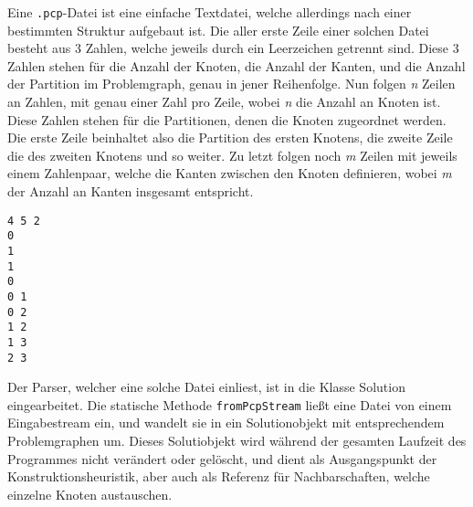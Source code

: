 Eine \texttt{.pcp}-Datei ist eine einfache Textdatei, welche allerdings nach einer bestimmten Struktur aufgebaut ist. Die aller erste Zeile
einer solchen Datei besteht aus 3 Zahlen, welche jeweils durch ein Leerzeichen getrennt sind. Diese 3 Zahlen stehen für die Anzahl der Knoten, 
die Anzahl der Kanten, und die Anzahl der Partition im Problemgraph, genau in jener Reihenfolge. Nun folgen \textit{n} Zeilen an Zahlen, mit 
genau einer Zahl pro Zeile, wobei \textit{n} die Anzahl an Knoten ist. Diese Zahlen stehen für die Partitionen, denen die Knoten zugeordnet werden.
Die erste Zeile beinhaltet also die Partition des ersten Knotens, die zweite Zeile die des zweiten Knotens und so weiter. Zu letzt folgen noch
\textit{m} Zeilen mit jeweils einem Zahlenpaar, welche die Kanten zwischen den Knoten definieren, wobei \textit{m} der Anzahl an Kanten insgesamt
entspricht.

\singlespacing
\begin{lstlisting}[caption={Eine einfache \textit{.pcp}-Beispieldatei},label={lst:pcp}]
4 5 2
0
1
1
0
0 1
0 2
1 2
1 3
2 3
\end{lstlisting}

Der Parser, welcher eine solche Datei einliest, ist in die Klasse Solution eingearbeitet. Die statische Methode \texttt{fromPcpStream} ließt eine
Datei von einem Eingabestream ein, und wandelt sie in ein Solutionobjekt mit entsprechendem Problemgraphen um. Dieses Solutiobjekt wird während
der gesamten Laufzeit des Programmes nicht verändert oder gelöscht, und dient als Ausgangspunkt der Konstruktionsheuristik, aber auch als
Referenz für Nachbarschaften, welche einzelne Knoten austauschen.

